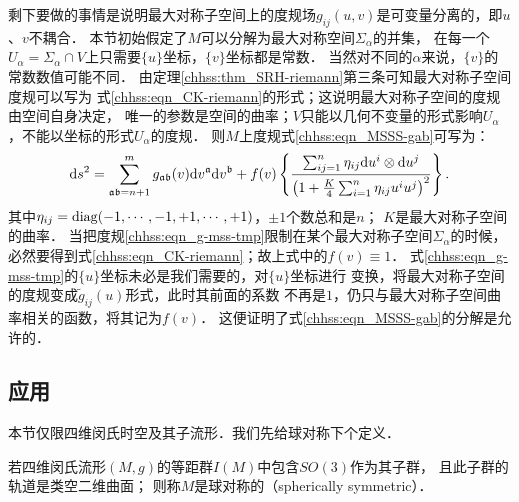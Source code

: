 剩下要做的事情是说明最大对称子空间上的度规场$g_{i j}(u, v)$是可变量分离的，即$u$、$v$不耦合．
本节初始假定了$M$可以分解为最大对称空间$\Sigma_\alpha$的并集，
在每一个$U_\alpha = \Sigma_\alpha \cap V$上只需要$\{u\}$坐标，$\{v\}$坐标都是常数．
当然对不同的$\alpha$来说，$\{v\}$的常数数值可能不同．
由定理\ref{chhss:thm_SRH-riemann}第三条可知最大对称子空间度规可以写为
式\eqref{chhss:eqn_CK-riemann}的形式；这说明最大对称子空间的度规由空间自身决定，
唯一的参数是空间的曲率；$V$只能以几何不变量的形式影响$U_\alpha$，不能以坐标的形式$U_\alpha$的度规．
则$M$上度规式\eqref{chhss:eqn_MSSS-gab}可写为：
\begin{equation}\label{chhss:eqn_g-mss-tmp}
    \mathrm{d} s^2= \sum_{\mathfrak{ab}=n+1}^{m}
    g_{\mathfrak{ab}}(v) \mathrm{d} v^{\mathfrak{a}} \mathrm{d} v^{\mathfrak{b}}
    +f(v)\left\{\frac{\sum_{ij=1}^{n} \eta_{ij} {\rm d}u^i \otimes {\rm d}u^j }
    {\left(1+\tfrac{K}{4} \sum_{i=1}^{n}\eta_{ij}  u^i u^j\right)^2}\right\} .
\end{equation}
其中$\eta_{ij}={\rm diag}(-1,\cdots,-1,+1,\cdots,+1)$，$\pm 1$个数总和是$n$；
$K$是最大对称子空间的曲率．
当把度规\eqref{chhss:eqn_g-mss-tmp}限制在某个最大对称子空间$\Sigma_\alpha$的时候，
必然要得到式\eqref{chhss:eqn_CK-riemann}；故上式中的$f(v)\equiv 1$．
式\eqref{chhss:eqn_g-mss-tmp}的$\{u\}$坐标未必是我们需要的，对$\{u\}$坐标进行
变换，将最大对称子空间的度规变成$\tilde{g}_{i j}(u)$形式，此时其前面的系数
不再是$1$，仍只与最大对称子空间曲率相关的函数，将其记为$f(v)$．
这便证明了式\eqref{chhss:eqn_MSSS-gab}的分解是允许的．



\subsection{应用}

本节仅限四维闵氏时空及其子流形．我们先给球对称下个定义．


\begin{definition}\label{chhss:def_Spherical-Symmetry}
    若四维闵氏流形$(M,g)$的等距群$I(M)$中包含$SO(3)$作为其子群，
    且此子群的轨道是类空二维曲面；
    则称$M$是{\heiti 球对称的}（spherically symmetric）．
\end{definition}


